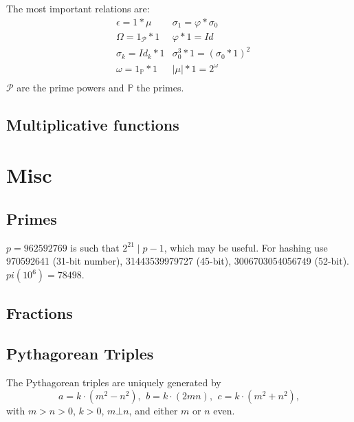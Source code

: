  The most important relations are:
 \begin{align*}
	&\epsilon = 1*\mu & \sigma_1 =\varphi * \sigma_0 \\
	&\Omega = 1_{\mathcal{P}}*1 & \varphi * 1 = Id \\
	&\sigma_k = Id_k* 1 & \sigma_0^3*1 = (\sigma_0 *1)^2 \\
	&\omega = 1_{\mathbb{P}}*1 & |\mu|*1= 2^\omega \\
 \end{align*}
 $\mathcal{P}$ are the prime powers and $\mathbb{P}$ the primes.
\subsection{Multiplicative functions}

	\section{Misc}
	\subsection{Primes}
	$p=962592769$ is such that $2^{21} \mid p-1$, which may be useful. For hashing
	use 970592641 (31-bit number), 31443539979727 (45-bit), 3006703054056749
	(52-bit). $pi(10^6) = 78498$.

	\subsection{Fractions}

	\subsection{Pythagorean Triples}
	The Pythagorean triples are uniquely generated by
	\[ a=k\cdot (m^{2}-n^{2}),\ \,b=k\cdot (2mn),\ \,c=k\cdot (m^{2}+n^{2}), \]
	with $m > n > 0$, $k > 0$, $m \bot n$, and either $m$ or $n$ even.



